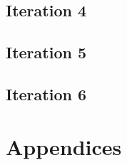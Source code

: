 \documentclass[onecolumn, draftclsnofoot,10pt, compsoc]{IEEEtran}
\begin{document}
		\subsection{Iteration 4}
		\subsection{Iteration 5}
		\subsection{Iteration 6}


	\section{Appendices} %
\end{document}
